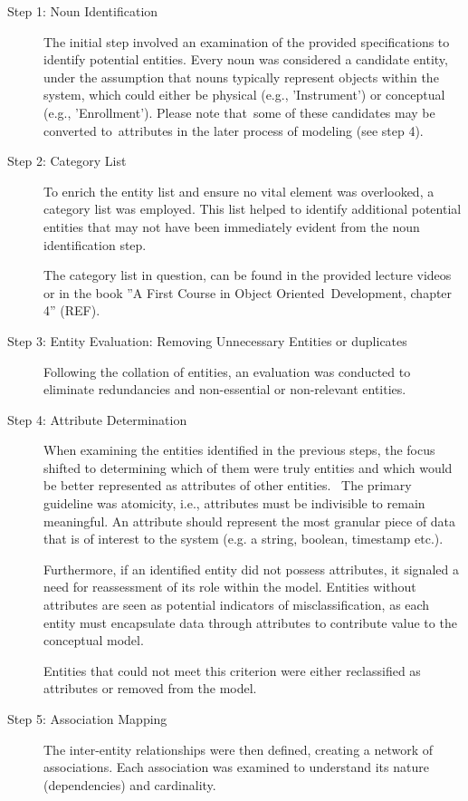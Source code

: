 \documentclass[a4paper]{scrartcl}
\begin{document}
\begin{description}
  \item[Step 1: Noun Identification] 
  The initial step involved an examination of the provided specifications to
  identify potential entities. Every noun was considered a candidate entity,
  under the assumption that nouns typically represent objects within the system,
  which could either be physical (e.g., 'Instrument') or conceptual (e.g.,
  'Enrollment'). Please note that some of these candidates may be converted
  to attributes in the later process of modeling (see step 4).

  \item[Step 2: Category List] To enrich the entity list and ensure no vital
  element was overlooked, a category list was employed. This list helped to
  identify additional potential entities that may not have been immediately
  evident from the noun identification step.
  
  The category list in question, can be found in the provided lecture videos or
  in the book ''A First Course in Object Oriented Development, chapter 4''
  (REF).

  \item[Step 3: Entity Evaluation: Removing Unnecessary Entities or duplicates]
  Following the collation of entities, an evaluation was conducted to eliminate
  redundancies and non-essential or non-relevant entities. 

  \item[Step 4: Attribute Determination]
  When examining the entities identified in the previous steps, the focus
  shifted to determining which of them were truly entities and which would be
  better represented as attributes of other entities. 
  The primary guideline was atomicity, i.e., attributes must be indivisible to remain meaningful. An attribute should represent the most granular piece of data that is of interest to the system (e.g. a string, boolean, timestamp etc.). 

  Furthermore, if an identified entity did not possess attributes, it signaled a
  need for reassessment of its role within the model. Entities without
  attributes are seen as potential indicators of misclassification, as each
  entity must encapsulate data through attributes to contribute value to the
  conceptual model.

  Entities that could not meet this criterion were either reclassified as
  attributes or removed from the model. 

  \item[Step 5: Association Mapping]
  The inter-entity relationships were then defined, creating a network of
  associations. Each association was examined to understand its nature
  (dependencies) and cardinality.


\end{description}
\end{document}
